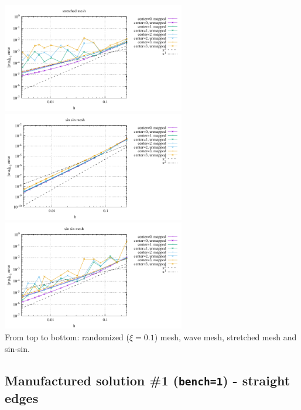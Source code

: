 \begin{center}
\includegraphics[width=8cm]{python_codes/fieldstone_76/results/bench3/curved/errors_P_mt4.pdf}\\
\includegraphics[width=8cm]{python_codes/fieldstone_76/results/bench3/curved/errors_V_mt5.pdf}
\includegraphics[width=8cm]{python_codes/fieldstone_76/results/bench3/curved/errors_P_mt5.pdf}\\
{\captionfont From top to bottom: randomized ($\xi=0.1$) mesh,
wave mesh, stretched mesh and sin-sin.}
\end{center}

\newpage
\subsection*{Manufactured solution \#1 ({\tt bench=1}) - straight edges}

